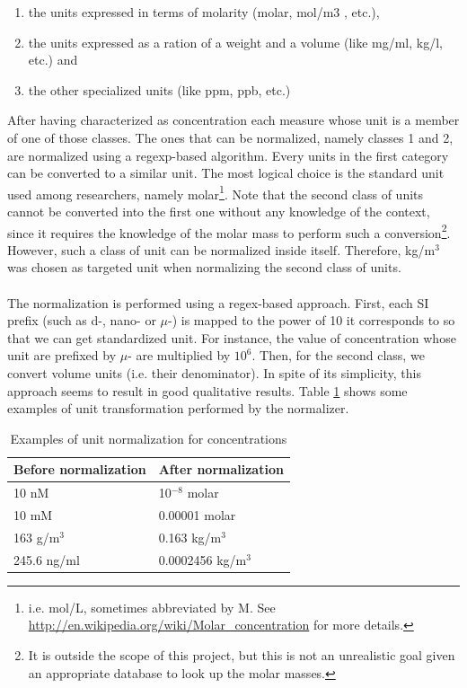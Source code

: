 \documentclass{report}
\begin{document}
                \begin{enumerate}[1.]
					\item the units expressed in terms of molarity (molar, mol/m3 , etc.),
					\item the units expressed as a ration of a weight and a volume (like mg/ml, kg/l, etc.) and
					\item the other specialized units (like ppm, ppb, etc.)
				\end{enumerate}
								
				After having characterized as concentration each measure whose 
				unit is a member of one of those classes. The ones that can be 
				normalized, namely classes 1 and 2, are normalized using a
				regexp-based algorithm. Every units in the first category can be 
				converted to a similar unit. The
				most logical choice is the standard unit used among researchers, 
				namely molar\footnote{i.e. mol/L, sometimes abbreviated by M. See
				\url{http://en.wikipedia.org/wiki/Molar_concentration} for more
				details.}. Note that the second class of units cannot be 
				converted into the first one without any knowledge of the context,
				since it requires the knowledge of the molar mass to perform such 
				a conversion\footnote{It is outside the scope of this project, 
				but this is not an unrealistic goal given an appropriate database
				to look up the molar masses.}.
				However, such a class of unit can be normalized inside itself. 	
				Therefore, kg/m$^3$ was chosen as targeted unit when normalizing the second 
				class of units.
				
				\paragraph{}The normalization is performed using a regex-based 
				approach. First, each SI prefix (such as d-, nano- or $\mu$-) is
				mapped to the power of 10 it corresponds to so that we can get
				standardized unit. For instance, the value of concentration whose unit 
				are prefixed by $\mu$- are multiplied by $10^{6}$. 
				Then, for the second class, we convert volume units (i.e. their 
				denominator). In spite of its simplicity,
				this approach seems to result in good qualitative results. 
				Table \ref{tab:concentration} 
				shows some examples of unit transformation performed by the 
				normalizer.
				
				\begin{table}[h!]
					\centering
					\begin{tabular}{|l|l|}
						\hline
						\textbf{Before normalization} & \textbf{After normalization}\\
						\hline
						10 nM & 10$^{-8}$ molar\\
						10 mM & 0.00001 molar\\
						163 g/m$^3$ & 0.163 kg/m$^3$\\
						245.6 ng/ml & 0.0002456 kg/m$^3$\\
						\hline
					\end{tabular}
					\caption{Examples of unit normalization for concentrations}
					\label{tab:concentration}
				\end{table}
                
\end{document}
